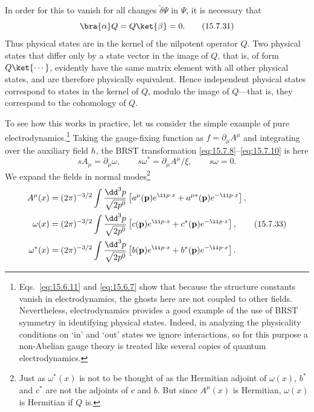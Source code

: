 In order for this to vanish for all changes $\widetilde\delta\Psi$ in $\Psi$, it is necessary that
\begin{equation}
 \bra{\alpha}Q=Q\ket{\beta}=0.
 \tag{15.7.31}\label{eq:15.7.31}
\end{equation}
Thus physical states are in the kernel of the nilpotent operator $Q$. Two physical states that differ only by a state vector in the image of $Q$, that is, of form $Q\ket{\cdots}$, evidently have the same matrix element with all other physical states, and are therefore physically equivalent. Hence independent physical states correspond to states in the kernel of $Q$, modulo the image of $Q$---that is, they correspond to the cohomology of $Q$.

To see how this works in practice, let us consider the simple example of pure electrodynamics.\footnote{Eqs.~\eqref{eq:15.6.11} and \eqref{eq:15.6.7} show that because the structure constants vanish in electrodynamics, the ghosts here are not coupled to other fields. Nevertheless, electrodynamics provides a good example of the use of BRST symmetry in identifying physical states. Indeed, in analyzing the physicality conditions on `in' and `out' states we ignore interactions, so for this purpose a non-Abelian gauge theory is treated like several copies of quantum electrodynamics.} Taking the gauge-fixing function as $f=\partial_\mu A^\mu$ and integrating over the auxiliary field $h$, the BRST transformation \eqref{eq:15.7.8}--\eqref{eq:15.7.10} is here
\begin{equation}
 sA_\mu=\partial_\mu\omega,
 \qquad s\omega^*=\partial_\mu A^\mu/\xi,
 \qquad s\omega=0.
 \tag{15.7.32}\label{eq:15.7.32}
\end{equation}
We expand the fields in normal modes\footnote{Just as $\omega^*(x)$ is not to be thought of as the Hermitian adjoint of $\omega(x)$, $b^*$ and $c^*$ are not the adjoints of $c$ and $b$. But since $A^\mu(x)$ is Hermitian, $\omega(x)$ is Hermitian if $Q$ is.}
\begin{align}
 A^\mu(x)&=(2\pi)^{-3/2}\int\frac{\dd^3p}{\sqrt{2p^0}}
 \left[a^\mu(\mathbf p)e^{\ii p\cdot x}+a^{\mu*}(\mathbf p)e^{-\ii p\cdot x}\right],\notag\\
 \omega(x)&=(2\pi)^{-3/2}\int\frac{\dd^3p}{\sqrt{2p^0}}
 \left[c(\mathbf p)e^{\ii p\cdot x}+c^*(\mathbf p)e^{-\ii p\cdot x}\right],\tag{15.7.33}\label{eq:15.7.33}\\
 \omega^*(x)&=(2\pi)^{-3/2}\int\frac{\dd^3p}{\sqrt{2p^0}}
 \left[b(\mathbf p)e^{\ii p\cdot x}+b^*(\mathbf p)e^{-\ii p\cdot x}\right].\notag
\end{align}
